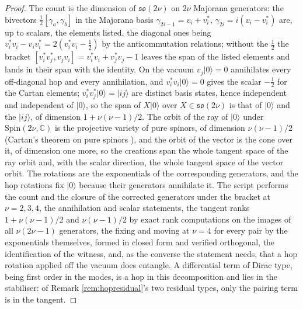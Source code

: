 \documentclass[11pt]{article}
\theoremstyle{definition}
\newcommand{\C}{\mathbb{C}}
\begin{document}
\begin{proof}
The count is the dimension of $\mathfrak{so}(2\nu)$ on $2\nu$ Majorana generators: the bivectors $\tfrac12[\gamma_a, \gamma_b]$ in the Majorana basis $\gamma_{2i-1} = v_i + v^*_i$, $\gamma_{2i} = i(v_i - v^*_i)$ are, up to scalars, the elements listed, the diagonal ones being $v^*_i v_i - v_i v^*_i = 2(v^*_i v_i - \tfrac12)$ by the anticommutation relations; without the $\tfrac12$ the bracket $[v^*_i v^*_j, v_j v_i] = v^*_i v_i + v^*_j v_j - 1$ leaves the span of the listed elements and lands in their span with the identity. On the vacuum $v_j|0\rangle = 0$ annihilates every off-diagonal hop and every annihilation, and $v^*_i v_i|0\rangle = 0$ gives the scalar $-\tfrac12$ for the Cartan elements; $v^*_i v^*_j|0\rangle = |ij\rangle$ are distinct basis states, hence independent and independent of $|0\rangle$, so the span of $X|0\rangle$ over $X \in \mathfrak{so}(2\nu)$ is that of $|0\rangle$ and the $|ij\rangle$, of dimension $1 + \nu(\nu - 1)/2$. The orbit of the ray of $|0\rangle$ under $\mathrm{Spin}(2\nu, \C)$ is the projective variety of pure spinors, of dimension $\nu(\nu - 1)/2$ (Cartan's theorem on pure spinors \cite{Chevalley1954}), and the orbit of the vector is the cone over it, of dimension one more, so the creations span the whole tangent space of the ray orbit and, with the scalar direction, the whole tangent space of the vector orbit. The rotations are the exponentials of the corresponding generators, and the hop rotations fix $|0\rangle$ because their generators annihilate it. The script performs the count and the closure of the corrected generators under the bracket at $\nu = 2, 3, 4$, the annihilation and scalar statements, the tangent ranks $1 + \nu(\nu - 1)/2$ and $\nu(\nu - 1)/2$ by exact rank computations on the images of all $\nu(2\nu - 1)$ generators, the fixing and moving at $\nu = 4$ for every pair by the exponentials themselves, formed in closed form and verified orthogonal, the identification of the witness, and, as the converse the statement needs, that a hop rotation applied off the vacuum does entangle. A differential term of Dirac type, being first order in the modes, is a hop in this decomposition and lies in the stabiliser: of Remark \ref{rem:hopresidual}'s two residual types, only the pairing term is in the tangent.
\end{proof}
\end{document}
